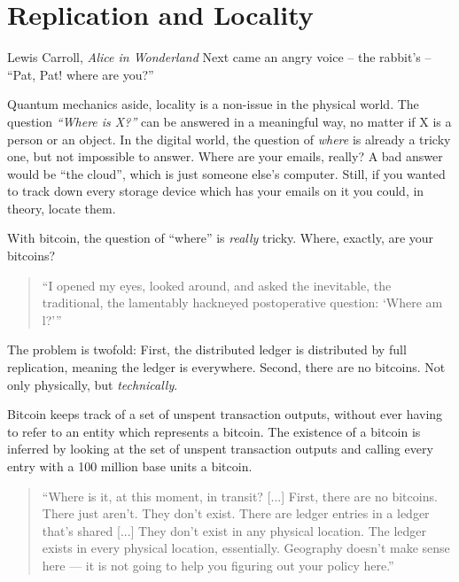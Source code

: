 \chapter{ Replication and Locality}
\label{les:3}

\begin{chapquote}{Lewis Carroll, \textit{Alice in Wonderland}}
Next came an angry voice -- the rabbit's -- ``Pat, Pat! where are you?''
\end{chapquote}

Quantum mechanics aside, locality is a non-issue in the physical world.
The question \textit{``Where is X?''} can be answered in a meaningful way, no
matter if X is a person or an object. In the digital world, the question
of \textit{where} is already a tricky one, but not impossible to answer. Where
are your emails, really? A bad answer would be ``the cloud'', which is
just someone else's computer. Still, if you wanted to track down every
storage device which has your emails on it you could, in theory, locate
them.

With bitcoin, the question of ``where'' is \textit{really} tricky. Where,
exactly, are your bitcoins?

\begin{quotation}
``I opened my eyes, looked around, and asked the inevitable, the
traditional, the lamentably hackneyed postoperative question: `Where
am l?'''
\end{quotation}

The problem is twofold: First, the distributed ledger is distributed by
full replication, meaning the ledger is everywhere. Second, there are no
bitcoins. Not only physically, but \textit{technically}.

Bitcoin keeps track of a set of unspent transaction outputs, without
ever having to refer to an entity which represents a bitcoin. The
existence of a bitcoin is inferred by looking at the set of unspent
transaction outputs and calling every entry with a 100 million base
units a bitcoin.

\begin{quotation}
``Where is it, at this moment, in transit? [...] First, there are no
bitcoins. There just aren't. They don't exist. There are ledger
entries in a ledger that's shared [...] They don't exist in any
physical location. The ledger exists in every physical location,
essentially. Geography doesn't make sense here --- it is not going to
help you figuring out your policy here.''\cite{wbd049}
\end{quotation}

